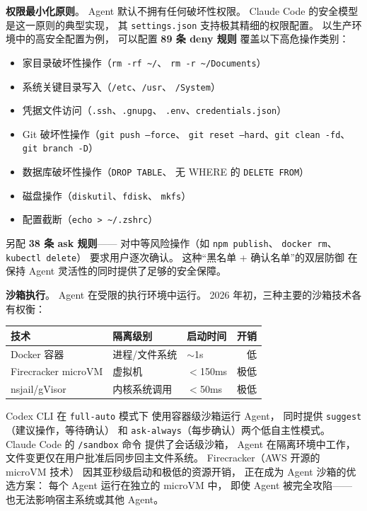 \textbf{权限最小化原则}。
Agent 默认不拥有任何破坏性权限。
Claude Code 的安全模型是这一原则的典型实现，
其 \texttt{settings.json} 支持极其精细的权限配置。
以生产环境中的高安全配置为例，
可以配置 \textbf{89 条 deny 规则}
覆盖以下高危操作类别：
\begin{itemize}[noitemsep]
  \item 家目录破坏性操作（\texttt{rm -rf \~{}/}、
        \texttt{rm -r \~{}/Documents}）
  \item 系统关键目录写入（\texttt{/etc}、\texttt{/usr}、
        \texttt{/System}）
  \item 凭据文件访问（\texttt{.ssh}、\texttt{.gnupg}、
        \texttt{.env}、\texttt{credentials.json}）
  \item Git 破坏性操作（\texttt{git push --force}、
        \texttt{git reset --hard}、\texttt{git clean -fd}、
        \texttt{git branch -D}）
  \item 数据库破坏性操作（\texttt{DROP TABLE}、
        无 WHERE 的 \texttt{DELETE FROM}）
  \item 磁盘操作（\texttt{diskutil}、\texttt{fdisk}、
        \texttt{mkfs}）
  \item 配置截断（\texttt{echo > \~{}/.zshrc}）
\end{itemize}
另配 \textbf{38 条 ask 规则}——
对中等风险操作（如 \texttt{npm publish}、
\texttt{docker rm}、\texttt{kubectl delete}）
要求用户逐次确认。
这种“黑名单 + 确认名单”的双层防御
在保持 Agent 灵活性的同时提供了足够的安全保障。

\textbf{沙箱执行}。
Agent 在受限的执行环境中运行。
2026 年初，三种主要的沙箱技术各有权衡：

\begin{center}\small
\renewcommand{\arraystretch}{1.3}
\begin{tabular}{lllr}
  \toprule
  \rowcolor{figLightGray}
  \textbf{技术} & \textbf{隔离级别} & \textbf{启动时间} & \textbf{开销} \\
  \midrule
  Docker 容器 & 进程/文件系统 & $\sim$1s & 低 \\
  Firecracker microVM & 虚拟机 & $<$150ms & 极低 \\
  nsjail/gVisor & 内核系统调用 & $<$50ms & 极低 \\
  \bottomrule
\end{tabular}
\end{center}

Codex CLI 在 \texttt{full-auto} 模式下
使用容器级沙箱运行 Agent，
同时提供 \texttt{suggest}（建议操作，等待确认）
和 \texttt{ask-always}（每步确认）两个低自主性模式。
Claude Code 的 \texttt{/sandbox} 命令
提供了会话级沙箱，
Agent 在隔离环境中工作，
文件变更仅在用户批准后同步回主文件系统。
Firecracker（AWS 开源的 microVM 技术）
因其亚秒级启动和极低的资源开销，
正在成为 Agent 沙箱的优选方案：
每个 Agent 运行在独立的 microVM 中，
即使 Agent 被完全攻陷——
也无法影响宿主系统或其他 Agent。

